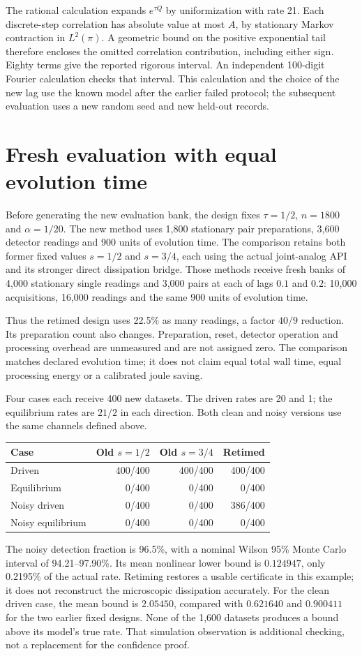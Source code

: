 The rational calculation expands $e^{\tau Q}$ by uniformization with rate 21.
Each discrete-step correlation has absolute value at most $A$, by stationary
Markov contraction in $L^2(\pi)$. A geometric bound on the positive exponential
tail therefore encloses the omitted correlation contribution, including either
sign. Eighty terms give the reported rigorous interval. An independent
100-digit Fourier calculation checks that interval. This calculation and the
choice of the new lag use the known model after the earlier failed protocol;
the subsequent evaluation uses a new random seed and new held-out records.

\section{Fresh evaluation with equal evolution time}
Before generating the new evaluation bank, the design fixes
$\tau=1/2$, $n=1800$ and $\alpha=1/20$. The new method uses 1,800 stationary
pair preparations, 3,600 detector readings and 900 units of evolution time.
The comparison retains both former fixed values $s=1/2$ and $s=3/4$, each
using the actual joint-analog API and its stronger direct dissipation bridge.
Those methods receive fresh banks of 4,000 stationary single readings and
3,000 pairs at each of lags $0.1$ and $0.2$: 10,000 acquisitions, 16,000
readings and the same 900 units of evolution time.

Thus the retimed design uses 22.5\% as many readings, a factor $40/9$
reduction. Its preparation count also changes. Preparation, reset, detector
operation and processing overhead are unmeasured and are not assigned zero.
The comparison matches declared evolution time; it does not claim equal
total wall time, equal processing energy or a calibrated joule saving.

Four cases each receive 400 new datasets. The driven rates are 20 and 1;
the equilibrium rates are $21/2$ in each direction. Both clean and noisy
versions use the same channels defined above.
\begin{center}
\begin{tabular}{lrrr}
\toprule
Case & Old $s=1/2$ & Old $s=3/4$ & Retimed\\
\midrule
Driven &400/400&400/400&400/400\\
Equilibrium &0/400&0/400&0/400\\
Noisy driven &0/400&0/400&386/400\\
Noisy equilibrium &0/400&0/400&0/400\\
\bottomrule
\end{tabular}
\end{center}
The noisy detection fraction is 96.5\%, with a nominal Wilson 95\% Monte
Carlo interval of 94.21--97.90\%. Its mean nonlinear lower bound is
$0.124947$, only 0.2195\% of the actual rate. Retiming restores a usable
certificate in this example; it does not reconstruct the microscopic
dissipation accurately. For the clean driven case, the mean bound is
$2.05450$, compared with $0.621640$ and $0.900411$ for the two earlier fixed
designs. None of the 1,600 datasets produces a bound above its model's true
rate. That simulation observation is additional checking, not a replacement
for the confidence proof.

